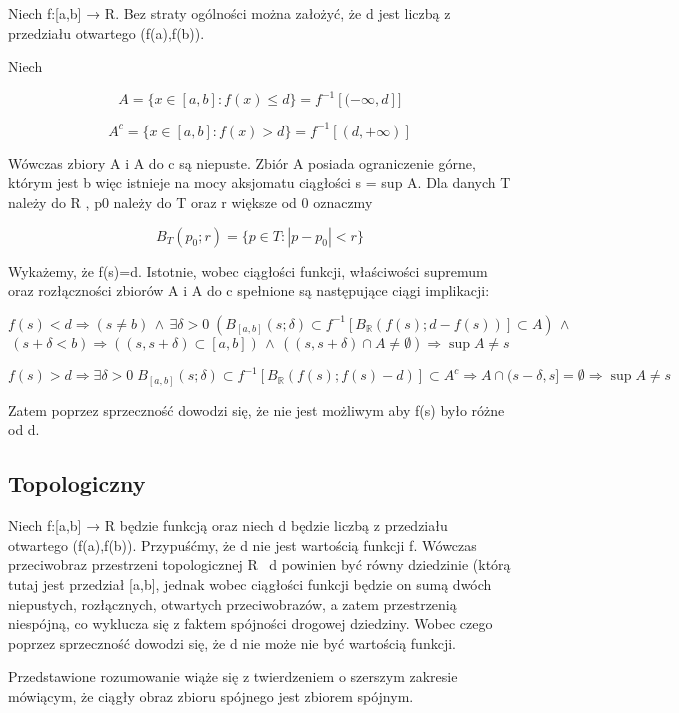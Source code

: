 \documentclass{article}
\begin{document}
Niech f:[a,b] → R. Bez straty ogólności można założyć, że d jest liczbą z przedziału otwartego (f(a),f(b)). 

Niech

\begin{equation*}
	A=\{x\in [a,b]\colon f(x)\leq d\}=f^{-1}[(-\infty ,d]]
\end{equation*}

\begin{equation}
	A^{c}=\{x\in [a,b]\colon f(x)>d\}=f^{-1}[(d,+\infty )]
\end{equation}

Wówczas zbiory A i A do c są niepuste. Zbiór A posiada ograniczenie górne, którym jest b więc istnieje na mocy aksjomatu ciągłości s = sup A. Dla danych T należy do R , p0 należy do T oraz r większe od 0 oznaczmy 

\[B_{T}(p_{0};r)=\{p\in T:|p-p_{0}|<r\}\]

Wykażemy, że f(s)=d. Istotnie, wobec ciągłości funkcji, właściwości supremum oraz rozłączności zbiorów A i A do c spełnione są następujące ciągi implikacji:

\begin{displaymath}
	f(s)<d\Rightarrow (s\neq b)\,\land \,\exists {\delta >0}\;(B_{[a,b]}(s;\delta )\subset f^{-1}[B_{\mathbb {R} }(f(s);d-f(s))]\subset A)\,\land \, 
\end{displaymath}
\[(s+\delta <b)\Rightarrow ((s,s+\delta )\subset [a,b])\,\land \,((s,s+\delta )\cap A\neq \emptyset )\Rightarrow \sup A\neq s\]

\begin{equation*}
	f(s)>d\Rightarrow \exists {\delta >0}\;B_{[a,b]}(s;\delta )\subset f^{-1}[B_{\mathbb {R} }(f(s);f(s)-d)]\subset A^{c}\Rightarrow A\cap (s-\delta ,s]=\emptyset \Rightarrow \sup A\neq s
\end{equation*}

Zatem poprzez sprzeczność dowodzi się, że nie jest możliwym aby f(s) było różne od d.

\subsection*{Topologiczny}
Niech f:[a,b] → R będzie funkcją oraz niech d będzie liczbą z przedziału otwartego (f(a),f(b)). Przypuśćmy, że d nie jest wartością funkcji f. Wówczas przeciwobraz przestrzeni topologicznej R \ {d} powinien być równy dziedzinie (którą tutaj jest przedział [a,b], jednak wobec ciągłości funkcji będzie on sumą dwóch niepustych, rozłącznych, otwartych przeciwobrazów, a zatem przestrzenią niespójną, co wyklucza się z faktem spójności drogowej dziedziny. Wobec czego poprzez sprzeczność dowodzi się, że d nie może nie być wartością funkcji. 

Przedstawione rozumowanie wiąże się z twierdzeniem o szerszym zakresie mówiącym, że ciągły obraz zbioru spójnego jest zbiorem spójnym.
\end{document}
